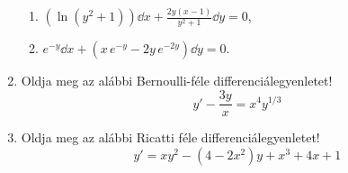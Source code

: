 \documentclass[a4paper, 12pt, fleqn]{scrartcl}
\begin{document}
\begin{enumerate}
\begin{enumerate}
          \item $\displaystyle
                  \left( \ln (y^2 + 1) \right) \dd x
                  + \frac{2y(x - 1)}{y^2 + 1} \dd y
                  = 0
                $,

          \item $\displaystyle
                  e^{-y} \dd x
                  + \left( x \, e^{-y} - 2y \, e^{-2y} \right) \dd y
                  = 0
                $.
        \end{enumerate}

  \item Oldja meg az alábbi Bernoulli-féle differenciálegyenletet!
        $$
          y' - \frac{3y}{x} = x^4 y^{1/3}
        $$

  \item Oldja meg az alábbi Ricatti féle differenciálegyenletet!
        $$
          y' = xy^2 - (4 - 2x^2)y + x^3 + 4x + 1
        $$
\end{enumerate}
\end{document}
